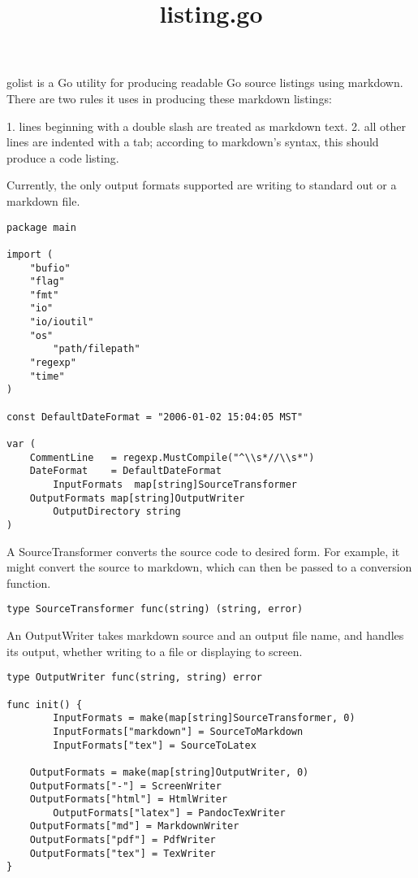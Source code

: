 \documentclass[11pt]{article}
\title{listing.go}
\begin{document}
\maketitle

golist is a Go utility for producing readable Go source listings
using markdown. There are two rules it uses in producing these
markdown listings:

1. lines beginning with a double slash are treated as markdown text.
2. all other lines are indented with a tab; according to markdown's
syntax, this should produce a code listing.

Currently, the only output formats supported are writing to standard out
or a markdown file.


\begin{verbatim}
package main

import (
	"bufio"
	"flag"
	"fmt"
	"io"
	"io/ioutil"
	"os"
        "path/filepath"
	"regexp"
	"time"
)

const DefaultDateFormat = "2006-01-02 15:04:05 MST"

var (
	CommentLine   = regexp.MustCompile("^\\s*//\\s*")
	DateFormat    = DefaultDateFormat
        InputFormats  map[string]SourceTransformer
	OutputFormats map[string]OutputWriter
        OutputDirectory string
)

\end{verbatim}

A SourceTransformer converts the source code to desired form. For example,
it might convert the source to markdown, which can then be passed to a
conversion function.


\begin{verbatim}
type SourceTransformer func(string) (string, error)

\end{verbatim}

An OutputWriter takes markdown source and an output file name, and
handles its output, whether writing to a file or displaying to screen.


\begin{verbatim}
type OutputWriter func(string, string) error

func init() {
        InputFormats = make(map[string]SourceTransformer, 0)
        InputFormats["markdown"] = SourceToMarkdown
        InputFormats["tex"] = SourceToLatex

	OutputFormats = make(map[string]OutputWriter, 0)
	OutputFormats["-"] = ScreenWriter
	OutputFormats["html"] = HtmlWriter
        OutputFormats["latex"] = PandocTexWriter
	OutputFormats["md"] = MarkdownWriter
	OutputFormats["pdf"] = PdfWriter
	OutputFormats["tex"] = TexWriter
}

\end{verbatim}
\end{document}
